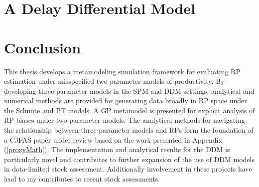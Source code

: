 \documentclass[12pt]{ucscthesis}
\begin{document}
%
\chapter{A Delay Differential Model \label{delayChapter}}


%
\chapter{Conclusion}
\clearpage

%


%

This thesis develops a metamodeling simulation framework for evaluating RP estimation 
under misspecified two-parameter models of productivity. By developing three-parameter 
models in the SPM and DDM settings, analytical and numerical methods are provided for 
generating data broadly in RP space under the Schnute and PT models. A GP metamodel is 
presented for explicit analysis of RP biases under two-parameter models. The analytical 
methods for navigating the relationship between three-parameter models and RPs form the 
foundation of a CJFAS paper under review based on the work presented in Appendix (\ref{proxyMath}). 
The implementation and analytical results for the DDM is particularly novel and 
contributes to further expansion of the use of DDM models in data-limited stock assessment. 
Additionally involvement in these projects have lead to my contributes to recent stock 
assessments\cite{dick_stock_2023}.   
\end{document}
